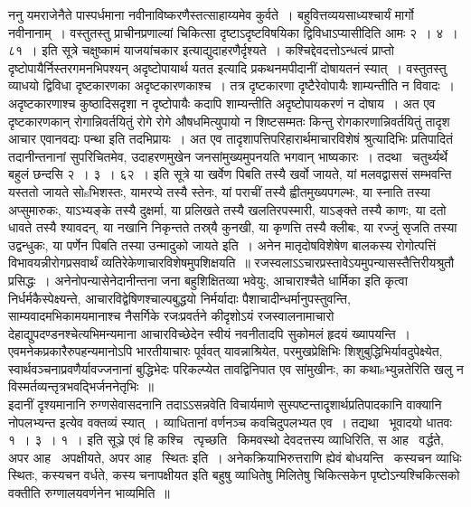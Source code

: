 \documentclass[11pt, openany]{book}
\begin{document}
ननु यमराजेनैते पास्पर्धमाना नवीनाविष्करणैस्तत्साहाय्यमेव कुर्वते~। बहुवित्तव्ययसाध्यश्चार्यं मार्गो नवीनानाम्~। वस्तुतस्तु प्राचीनप्रणाल्यां चिकित्सा दृष्टाऽदृष्टविषयिका द्विविधाऽप्यासीदिति आमः २~। ४~। ८१~। इति सूत्रे {\qt चक्षुष्कामं याजयांचकार} इत्याद्युदाहरणैर्दृश्यते~। कश्चिद्देवदत्तोऽन्धत्वं प्राप्तो दृष्टोपायैर्निस्तरगमनभिपश्यन् अदृष्टोपायार्थ यतत इत्यादि प्रकथनमपीदानीं दोषायतनं स्यात्~। वस्तुतस्तु व्याधयो द्विविधा दृष्टकारणका अदृष्टकारणकाश्च~। तत्र दृष्टकारणा दृष्टैरेवोपायैः शाम्यन्तीति न विवादः~। अदृष्टकारणाश्च कुष्ठादिसदृशा न दृष्टोपायैः कदापि शाम्यन्तीति अदृष्टोपायकरणं न दोषाय~। अत एव दृष्टकारणकान् रोगान्निवर्तयितुं रोगे रोगे औषधमित्युपायो न शिष्टसम्मतः किन्तु रोगकारणान्निवर्तयितुं तादृश आचार एवानवद्यः पन्था इति तदभिप्रायः~। अत एव तादृशापत्तिपरिहारार्थमाचारविशेषं श्रुत्यादिभिः प्रतिपादितं तदानीन्तनानां सुपरिचितमेव, उदाहरणमुखेन जनसांमुख्यमुपनयति भगवान् भाष्यकारः~। तदथा \textendash\ चतुर्थ्यर्थे बहुलं छन्दसि २~। ३~। ६२~। इति सूत्रे {\qt या खर्वेण पिबति तस्यै खर्वो जायते, यां मलवद्वाससं सम्भवन्ति यस्ततो जायते सोsभिशस्तः, यामरप्ये तस्यै स्तेनः, यां पराचीं तस्यै ह्वीतमुख्यपगल्भः, या स्नाति तस्या अप्सुमारुकः, याऽभ्यङ्के तस्यै दुक्षर्मा, या प्रलिखते तस्यै खलतिरपस्मारी, याऽङ्क्ते तस्यै काणः, या दतो धावते तस्यै श्यावदन्, या नखानि निकृन्तते तस्र्यै कुनखी, या कृणत्ति तस्यै क्लीबः, या रज्जुं सृजति तस्या उद्वन्धुकः, या पर्णेन पिबति तस्या उन्मादुको जायते} इति~। अनेन मातृदोषविशेषेण बालकस्य रोगोत्पत्तिं विभावयन्नीरोगप्रसवार्थं व्यतिरेकेणाचारविशेषमुपशिक्षयति~॥ रजस्वलाऽऽचारप्रस्तावेऽयमुपन्यासस्तैत्तिरीयश्रुतौ प्रसिद्धः~। अनेनोपन्यासेनेदानीन्तना जना बहुशिक्षितव्या भवेयुः, आचाराश्चैते धार्मिका इति कृत्वा निर्धर्मकैस्पेक्ष्यन्ते, आचारविद्वेषिणश्चाल्पबुद्धयो निर्मर्यादाः पैशाचादीन्धर्मानुपस्तुवन्ति, साम्यवादमभिकामयमानाश्च नैसर्गिके रजःप्रवर्तने कीदृशोऽयं रजस्वालनामाचारो देहाद्युपदण्डनश्चेत्यभिमन्यमाना आचारविच्छेदेन स्वीयं नवनीतादपि सुकोमलं हृदयं ख्यापयन्ति~। एवमनेकप्रकारैरुपहन्यमानोऽपि भारतीयाचारः पूर्ववत् यावन्नाश्रियेत, परमुखप्रेक्षिभिः शिशुबुद्धिभिर्यावदुपेक्ष्येत, स्वार्थवञ्चनाप्रवणैर्यावज्जनानां बुद्धिभेदः परिकल्प्येत तावद्विनिपात एव सांमुखीनः, का कथाsभ्युन्नतेरिति खलु न विस्मर्तव्यन्तृत्रभवद्भिर्जननेतृभिः~॥\\

इदानीं दृश्यमानानि रुग्णसेवासदनानि तदाऽऽसन्नवेति विचार्यमाणे सुस्पष्टन्तादृ्शार्थप्रतिपादकानि वाक्यानि नोपलभ्यन्त इत्येव वक्तव्यं स्यात्~। व्याधितानां वर्णनञ्च कवचिदुपलभ्यत एव~। तद्यथा \textendash\ भूवादयो धातवः १~। ३~। १~। इति सूञ्रे {\qt एवं हि कश्चि \textendash\ त्पृच्छति \textendash\ किमवस्थो देवदत्तस्य व्याधिरिति, स आह \textendash\ वर्द्धते, अपर आह \textendash\ अपक्षीयते, अपर आह \textendash\ स्थितः } इति~। अनेकक्रियाभिरुत्तराणि ह्येवं बोधयन्ति \textendash\ कस्यचन व्याधिः स्थितः, कस्यचन वर्धते, कस्य चनापक्षीयत इति बहुषु व्याधितेषु मिलितेषु चिकित्सकेन पृष्टोऽन्यश्चिकित्सको वक्तीति रुग्णालयवर्णनेन भाव्यमिति~॥\\
\end{document}
